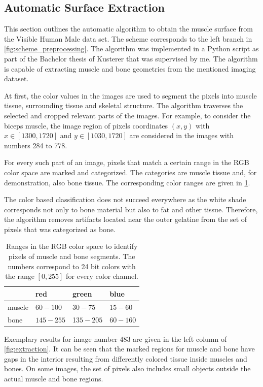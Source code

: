 \subsection{Automatic Surface Extraction}
This section outlines the automatic algorithm to obtain the muscle surface from the Visible Human Male data set. The scheme corresponds to the left branch in \cref{fig:scheme_preprocessing}. The algorithm was implemented in a Python script as part of the Bachelor thesis of Kusterer \cite{Kusterer} that was supervised by me.
The algorithm is capable of extracting muscle and bone geometries from the mentioned imaging dataset.

At first, the color values in the images are used to segment the pixels into muscle tissue, surrounding tissue and skeletal structure. The algorithm traverses the selected and cropped relevant parts of the images. For example, to consider the biceps muscle, the image region of pixels coordinates $(x,y)$ with $x \in [1300,1720] $ and $ y\in[1030,1720]$ are considered in the images with numbers 284 to 778. 

For every such part of an image, pixels that match a certain range in the RGB color space are marked and categorized. The categories are muscle tissue and, for demonstration, also bone tissue. The corresponding color ranges are given in \cref{tab:color_ranges}.

The color based classification does not succeed everywhere as the white shade corresponds not only to bone material but also to fat and other tissue. Therefore, the algorithm removes artifacts located near the outer gelatine from the set of pixels that was categorized as bone. 

\begin{table}
  \centering%
  \begin{tabular}{l|lll}
    \hline
    & red & green & blue\\
    \hline
    muscle & $60 - 100$& $30-75$   & $15-60$\\
    bone   & $145-255$ & 1$35-205$ & $60-160$\\
    \hline
  \end{tabular}
  \caption{Ranges in the RGB color space to identify pixels of muscle and bone segments. The numbers correspond to 24 bit colors with the range $[0,255]$ for every color channel.}%
  \label{tab:color_ranges}%
\end{table}

Exemplary results for image number 483 are given in the left column of \cref{fig:extraction}.
It can be seen that the marked regions for muscle and bone have gaps in the interior resulting from differently colored tissue inside muscles and bones. On some images, the set of pixels also includes small objects outside the actual muscle and bone regions.

